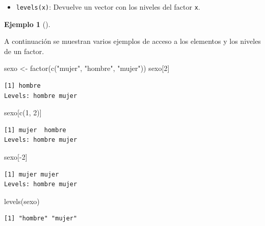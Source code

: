 \documentclass[
  a4paper,
]{scrreport}
\newenvironment{Shaded}{\begin{snugshade}}{\end{snugshade}}
\newcommand{\DecValTok}[1]{\textcolor[rgb]{0.68,0.00,0.00}{#1}}
\newcommand{\FunctionTok}[1]{\textcolor[rgb]{0.28,0.35,0.67}{#1}}
\newcommand{\NormalTok}[1]{\textcolor[rgb]{0.00,0.23,0.31}{#1}}
\newcommand{\OtherTok}[1]{\textcolor[rgb]{0.00,0.23,0.31}{#1}}
\newcommand{\SpecialCharTok}[1]{\textcolor[rgb]{0.37,0.37,0.37}{#1}}
\newcommand{\StringTok}[1]{\textcolor[rgb]{0.13,0.47,0.30}{#1}}
\providecommand{\tightlist}{%
  \setlength{\itemsep}{0pt}\setlength{\parskip}{0pt}}\usepackage{longtable,booktabs,array}
\theoremstyle{definition}
\newtheorem{example}{Ejemplo}[chapter]
\theoremstyle{definition}
\theoremstyle{remark}
\begin{document}
\begin{itemize}
\tightlist
\item
  \texttt{levels(x)}: Devuelve un vector con los niveles del factor
  \texttt{x}.
\end{itemize}

\leavevmode{}%
\begin{example}[]\label{exm-niveles-factor}

A continuación se muestran varios ejemplos de acceso a los elementos y
los niveles de un factor.

\begin{Shaded}
\begin{Highlighting}[]
\NormalTok{sexo }\OtherTok{\textless{}{-}} \FunctionTok{factor}\NormalTok{(}\FunctionTok{c}\NormalTok{(}\StringTok{"mujer"}\NormalTok{, }\StringTok{"hombre"}\NormalTok{, }\StringTok{"mujer"}\NormalTok{))}
\NormalTok{sexo[}\DecValTok{2}\NormalTok{]}
\end{Highlighting}
\end{Shaded}

\begin{verbatim}
[1] hombre
Levels: hombre mujer
\end{verbatim}

\begin{Shaded}
\begin{Highlighting}[]
\NormalTok{sexo[}\FunctionTok{c}\NormalTok{(}\DecValTok{1}\NormalTok{, }\DecValTok{2}\NormalTok{)]}
\end{Highlighting}
\end{Shaded}

\begin{verbatim}
[1] mujer  hombre
Levels: hombre mujer
\end{verbatim}

\begin{Shaded}
\begin{Highlighting}[]
\NormalTok{sexo[}\SpecialCharTok{{-}}\DecValTok{2}\NormalTok{]}
\end{Highlighting}
\end{Shaded}

\begin{verbatim}
[1] mujer mujer
Levels: hombre mujer
\end{verbatim}

\begin{Shaded}
\begin{Highlighting}[]
\FunctionTok{levels}\NormalTok{(sexo)}
\end{Highlighting}
\end{Shaded}

\begin{verbatim}
[1] "hombre" "mujer" 
\end{verbatim}

\end{example}
\end{document}
